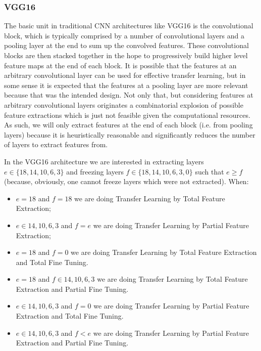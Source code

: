 
\subsubsection{VGG16}
The basic unit in traditional \ac{CNN} architectures like VGG16 is the convolutional block, which is typically comprised by a number of convolutional layers and a pooling layer at the end to sum up the convolved features. These convolutional blocks are then stacked together in the hope to progressively build higher level feature maps at the end of each block. It is possible that the features at an arbitrary convolutional layer can be used for effective transfer learning, but in some sense it is expected that the features at a pooling layer are more relevant because that was the intended design. Not only that, but considering features at arbitrary convolutional layers originates a combinatorial explosion of possible feature extractions which is just not feasible given the computational resources. As such, we will only extract features at the end of each block (i.e. from pooling layers) because it is heuristically reasonable and significantly reduces the number of layers to extract features from.

In the VGG16 architecture we are interested in extracting layers $e \in \{18,14,10,6,3\}$ and freezing layers $f \in \{18,14,10,6,3,0\}$ such that $e \geq f$ (because, obviously, one cannot freeze layers which were not extracted). When:


\begin{itemize}
    \item $e = 18$ and $f = 18$ we are doing Transfer Learning by Total Feature Extraction;
    \item $e \in {14,10,6,3}$ and $f = e$ we are doing Transfer Learning by Partial Feature Extraction;

    \item $e = 18$ and $f = 0$ we are doing Transfer Learning by Total Feature Extraction and Total Fine Tuning.
    \item $e = 18$ and $f \in {14,10,6,3}$ we are doing Transfer Learning by Total Feature Extraction and Partial Fine Tuning.

    \item $e \in {14,10,6,3}$ and $f = 0$ we are doing Transfer Learning by Partial Feature Extraction and Total Fine Tuning.
    \item $e \in {14,10,6,3}$ and $f < e$ we are doing Transfer Learning by Partial Feature Extraction and Partial Fine Tuning.
\end{itemize}

